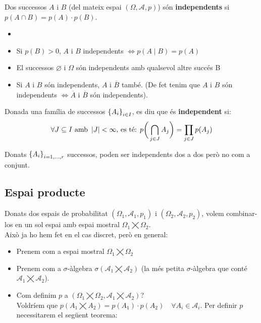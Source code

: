 \begin{defi}
  Dos successos $A$ i $B$ (del mateix espai $(\Omega, \mathcal{A}, p)$) són \textbf{independents} si $p(A\cap B) = p(A)\cdot p(B)$.
\end{defi}

\begin{obs}
  \begin{itemize}
      \item []
      \item Si $p(B) > 0$, $A$ i $B$ independents $\iff p(A\mid B)=p(A)$
      \item El successos $\varnothing$ i $\Omega$ són independents amb qualsevol altre succés B
      \item Si $A$ i $B$ són independents, $A$ i $\overline{B}$ també. (De fet tenim que $A$ i $B$ són independents $\iff \overline{A}$ i $\overline{B}$ són independents).
  \end{itemize}
\end{obs}

\begin{defi}
  Donada una família de successos $\left\{A_{i}\right\}_{i\in I}$, es diu que és \textbf{independent} si:
  \[
    \forall J \subseteq I \text{ amb } \left\vert J \right\vert < \infty \text{, es té: } p\bigg(\bigcap\limits_{j\in J}A_{j}\bigg) = \prod_{j\in J}p(A_{j}) 
  \]
\end{defi}

\begin{obs}
  Donats $\left\{A_{i}\right\}_{i = 1, \ldots, r}$ successos, poden ser independents dos a dos però no com a conjunt.
\end{obs}

\newpage

\subsection{Espai producte}

Donats dos espais de probabilitat $(\Omega_{1}, \mathcal{A}_{1}, p_{1})$ i $(\Omega_{2}, \mathcal{A}_{2}, p_{2})$, volem combinar-los en un sol espai amb espai mostral $\Omega_{1}\bigtimes\Omega_{2}$. \\
Això ja ho hem fet en el cas discret, però en general:
\begin{itemize}
    \item Prenem com a espai mostral $\Omega_{1}\bigtimes\Omega_{2}$
    \item Prenem com a $\sigma$-àlgebra $\sigma(\mathcal{A}_{1}\bigtimes\mathcal{A}_{2})$ (la més petita $\sigma$-àlgebra que conté $\mathcal{A}_{1}\bigtimes\mathcal{A}_{2}$).
    \item Com definim $p$ a $(\Omega_{1}\bigtimes\Omega_{2}, \mathcal{A}_{1}\bigtimes\mathcal{A}_{2})$? \\ Voldríem que $p(A_{1}\bigtimes A_{2}) = p(A_{1})\cdot p(A_{2}) \quad \forall A_{i} \in \mathcal{A}_{i}$. Per definir $p$ necessitarem el següent teorema:
\end{itemize}


